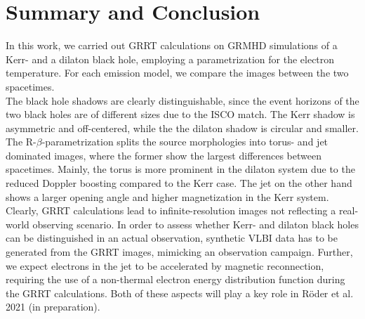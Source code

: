 \documentclass[a4paper,11pt]{article}
\begin{document}
\section{Summary and Conclusion}

In this work, we carried out GRRT calculations on GRMHD simulations of a Kerr- and a dilaton black hole, employing a parametrization for the electron temperature. For each emission model, we compare the images between the two spacetimes. \\
The black hole shadows are clearly distinguishable, since the event horizons of the two black holes are of different sizes due to the ISCO match. The Kerr shadow is asymmetric and off-centered, while the the dilaton shadow is circular and smaller. The R-$\beta$-parametrization splits the source morphologies into torus- and jet dominated images, where the former show the largest differences between spacetimes. Mainly, the torus is more prominent in the dilaton system due to the reduced Doppler boosting compared to the Kerr case. The jet on the other hand shows a larger opening angle and higher magnetization in the Kerr system.\\

Clearly, GRRT calculations lead to infinite-resolution images not reflecting a real-world observing scenario. In order to assess whether Kerr- and dilaton black holes can be distinguished in an actual observation, synthetic VLBI data has to be generated from the GRRT images, mimicking an observation campaign. Further, we expect electrons in the jet to be accelerated by magnetic reconnection, requiring the use of a non-thermal electron energy distribution function during the GRRT calculations. Both of these aspects will play a key role in Röder et al. 2021 (in preparation). 






\end{document}

